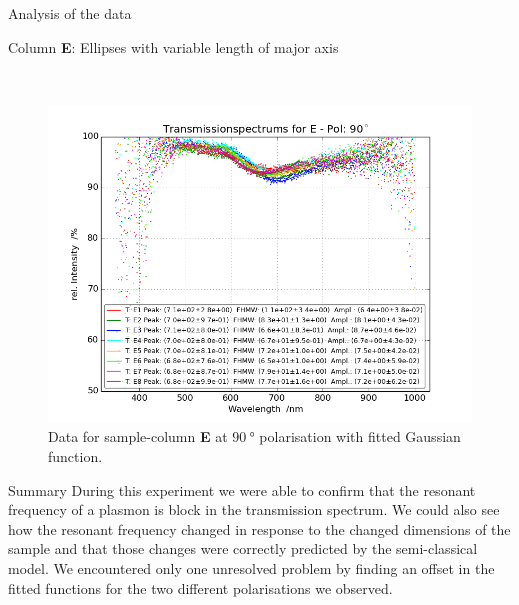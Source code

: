 \documentclass[pdftex, a4paper,11pt, twoside, UKenglish]{report}
\begin{document}
\begin{chapter}{Analysis of the data}
\begin{section}{Column \textbf{E}: Ellipses with variable length of
        major axis}
\begin{figure}[ht!]
\begin{minipage}{.95\textwidth}
          \label{fig:TransspecFIT_EPol0}
        \end{minipage}\\
        \begin{minipage}{.95\textwidth}
          \centering
          \includegraphics[width=\textwidth]
              {Figures/TransspecFIT_EPol90.png}
          \caption{Data for sample-column \textbf{E} at $\SI{90}{\degree}$
              polarisation with fitted Gaussian function.}
          \label{fig:TransspecFIT_EPol90}
        \end{minipage}
      \end{figure}
      
    \end{section}
    
    
    
    \begin{section}{Summary}
      \label{chp:AnalysisSummary}
      During this experiment we were able to confirm that the resonant frequency
      of a plasmon is block in the transmission spectrum. We could also see how
      the resonant frequency changed in response to the changed dimensions of
      the sample and that those changes were correctly predicted by the
      semi-classical model. \newline
      We encountered only one unresolved problem by finding an offset in the
      fitted functions for the two different polarisations we observed.
      
      
    \end{section}
   
  \end{chapter}
  
\end{document}
